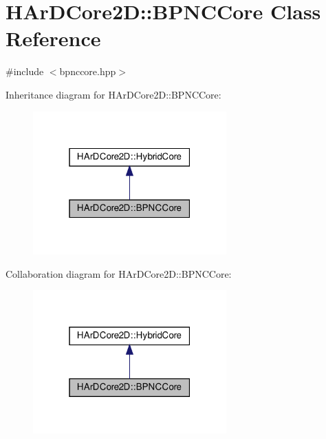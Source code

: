 \hypertarget{classHArDCore2D_1_1BPNCCore}{}\section{H\+Ar\+D\+Core2D\+:\+:B\+P\+N\+C\+Core Class Reference}
\label{classHArDCore2D_1_1BPNCCore}


{\ttfamily \#include $<$bpnccore.\+hpp$>$}



Inheritance diagram for H\+Ar\+D\+Core2D\+:\+:B\+P\+N\+C\+Core\+:\nopagebreak
\begin{figure}[H]
\begin{center}
\leavevmode
\includegraphics[width=211pt]{classHArDCore2D_1_1BPNCCore__inherit__graph}
\end{center}
\end{figure}


Collaboration diagram for H\+Ar\+D\+Core2D\+:\+:B\+P\+N\+C\+Core\+:\nopagebreak
\begin{figure}[H]
\begin{center}
\leavevmode
\includegraphics[width=211pt]{classHArDCore2D_1_1BPNCCore__coll__graph}
\end{center}
\end{figure}
